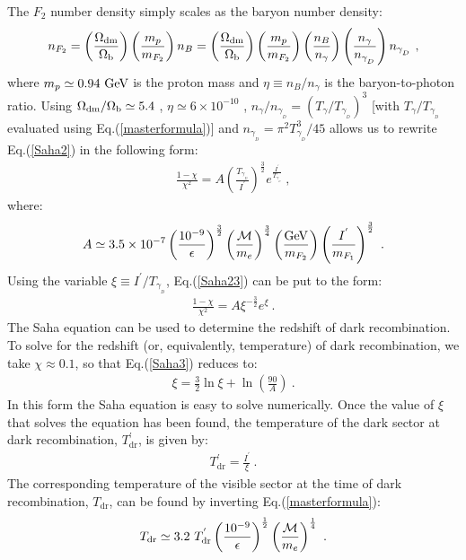 \documentclass[12pt]{article}
\begin{document}
%
The $F _2$ number density simply scales as the baryon number density:
%
\begin{eqnarray}
n _{F_2} = \left ( \frac{\Omega _{\text{dm}}}{\Omega _{\text b}} \right ) \left ( \frac{m _p}{m _{F_2}} \right ) n _B = \left ( \frac{\Omega _{\text{dm}}}{\Omega _{\text b}} \right ) \left ( \frac{m _p}{m _{F_2}} \right ) \left ( \frac{n _B}{n _{\gamma}} \right ) \left ( \frac{n _{\gamma}}{n _{\gamma _{_D}}} \right ) n _{\gamma _{_D}} \ ,
\label{nf2scale}
\end{eqnarray}
%
where $m _p \simeq 0.94 \ {\rm GeV}$ is the proton mass and $\eta \equiv n _B/n _{\gamma}$ is the baryon-to-photon ratio. Using $\Omega _{\text{dm}}/\Omega _{\text b} \simeq 5.4$ \cite{plax}, $\eta \simeq 6 \times 10 ^{-10}$ \cite{pdg}, $n _{\gamma}/n _{\gamma _{_D}} = \left (T _{\gamma}/T _{\gamma _{_D}} \right ) ^3$ [with $T _{\gamma}/T _{\gamma _{_D}}$ evaluated using Eq.(\ref{masterformula})] and $n _{\gamma _{_D}} = \pi ^2T _{\gamma _{_D}} ^3/45$ allows us to rewrite Eq.(\ref{Saha2}) in the following form:
%
\begin{eqnarray}
\frac{1 - \chi}{\chi ^2} = A \left ( \frac{T _{\gamma _{_D}}}{I ^{'}} \right ) ^{\frac{3}{2}} e ^{\frac{I ^{'}}{T _{\gamma _{_D}}}} \ ,
\label{Saha23}
\end{eqnarray}
%
where:
%
\begin{eqnarray}
A \simeq 3.5 \times 10 ^{-7} \left ( \frac{10 ^{-9}}{\epsilon} \right ) ^{\frac{3}{2}} \left ( \frac{{\cal M}}{m _e} \right ) ^{\frac{3}{4}} \left ( \frac{\rm GeV}{m _{F_2}} \right ) \left ( \frac{I ^{'}}{m _{F_1}} \right ) ^{\frac{3}{2}} \ .
\end{eqnarray}
%
Using the variable $\xi \equiv I ^{'}/T _{\gamma _{_D}}$, Eq.(\ref{Saha23}) can be put to the form:
%
\begin{eqnarray}
\frac{1 - \chi}{\chi ^2} = A \xi ^{-\frac{3}{2}} e ^{\xi} \ .
\label{Saha3}
\end{eqnarray}
%
The Saha equation can be used to determine the redshift of dark recombination. To solve for the redshift (or, equivalently, temperature) of dark recombination, we take $\chi \approx 0.1$, so that Eq.(\ref{Saha3}) reduces to:
%
\begin{eqnarray}
\xi = \frac{3}{2} \ln \xi + \ln \left ( \frac{90}{A} \right ) \ .
\label{sahafinal}
\end{eqnarray}
%
In this form the Saha equation is easy to solve numerically. Once  the value of $\xi$ that solves the equation has been found, the temperature of the dark sector at dark recombination, $T _{\text{dr}} ^{'}$, is given by:
%
\begin{eqnarray}
T _{\text{dr}} ^{'} = \frac{I ^{'}}{\xi} \ .
\label{tdark}
\end{eqnarray}
%
The corresponding temperature of the visible sector at the time of dark recombination, $T _{\text{dr}}$, can be found by inverting Eq.(\ref{masterformula}):
%
\begin{eqnarray}
T _{\text{dr}} \simeq 3.2 \ T _{\text{dr}} ^{'} \left ( \frac{10 ^{-9}}{\epsilon} \right ) ^{\frac{1}{2}} \left ( \frac{{\cal M}}{m _e} \right ) ^{\frac{1}{4}} \ .
\label{darkord}
\end{eqnarray}
%
\end{document}
